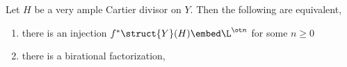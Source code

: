 \documentclass[12pt]{article}
\begin{document}
\begin{prop}
Let $H$ be a very ample Cartier divisor on $Y$. Then the following are equivalent,
\begin{enumerate}
\item there is an injection $f^* \struct{Y}(H) \embed \L^{\ot n}$ for some $n \ge 0$

\item there is a birational factorization,
\begin{center}
\end{center}
\end{enumerate}
\end{prop}
\end{document}
